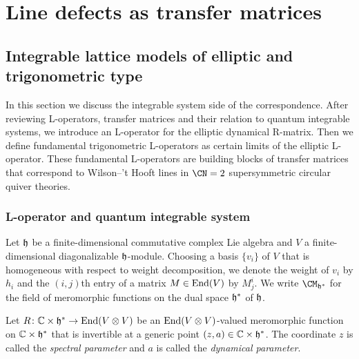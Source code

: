 \begin{comment}
\documentclass[11pt]{article}  %
\usepackage{Common/toshi}

\end{comment}




\section{Line defects as transfer matrices}
\label{sec:line_defects}








\subsection{Integrable lattice models of elliptic and trigonometric type}
\label{sec:QIS}

In this section we discuss the integrable system side of the
correspondence.  After reviewing L-operators, transfer matrices and
their relation to quantum integrable systems, we introduce an
L-operator for the elliptic dynamical R-matrix.  Then we define
fundamental trigonometric L-operators as certain limits of the
elliptic L-operator.  These fundamental L-operators are building
blocks of transfer matrices that correspond to Wilson--'t Hooft lines
in $\CN = 2$ supersymmetric circular quiver theories.


\subsubsection{L-operator and quantum integrable system}

Let $\mathfrak{h}$ be a finite-dimensional commutative complex Lie algebra and
$V$ a finite-dimensional diagonalizable $\mathfrak{h}$-module.  Choosing a
basis $\{v_i\}$ of $V$ that is homogeneous with respect to weight
decomposition, we denote the weight of $v_i$ by $h_i$ and the
$(i,j)$th entry of a matrix $M \in \mathop{\mathrm{End}}\nolimits(V)$ by $M^i_j$.  We write
$\CM_{\hf^*}$ for the field of meromorphic functions on the dual
space $\mathfrak{h}^*$ of $\mathfrak{h}$.

Let $R\colon \mathbb{C} \times \mathfrak{h}^* \to \mathop{\mathrm{End}}\nolimits(V \otimes V)$ be an
$\mathop{\mathrm{End}}\nolimits(V \otimes V)$-valued meromorphic function on
$\mathbb{C} \times \mathfrak{h}^*$ that is invertible at a generic point
$(z,a) \in \mathbb{C} \times \mathfrak{h}^*$.  The coordinate $z$ is called
the \emph{spectral parameter} and $a$ is called the
\emph{dynamical parameter}.

